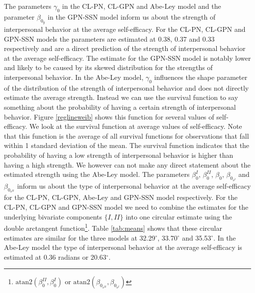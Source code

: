 \documentclass[man]{apa6}
\let\rmarkdownfootnote\footnote%
\def\footnote{\protect\rmarkdownfootnote}
\begin{document}
The parameters \(\gamma_0\) in the CL-PN, CL-GPN and Abe-Ley model and the
parameter \(\beta_{0_y}\) in the GPN-SSN model inform us about the strength of
interpersonal behavior at the average self-efficacy. For the CL-PN, CL-GPN and
GPN-SSN models the parameters are estimated at 0.38, 0.37 and 0.33 respectively
and are a direct prediction of the strength of interpersonal behavior at the
average self-efficacy. The estimate for the GPN-SSN model is notably lower and
likely to be caused by its skewed distribution for the strengths of
interpersonal behavior. In the Abe-Ley model, \(\gamma_0\) influences the shape
parameter of the distribution of the strength of interpersonal behavior and does
not directly estimate the average strength. Instead we can use the survival
function to say something about the probability of having a certain strength of
interpersonal behavior. Figure \ref{reglineweib} shows this function for several
values of self-efficacy. We look at the survival function at average values of
self-efficacy. Note that this function is the average of all survival functions
for observations that fall within 1 standard deviation of the mean. The survival
function indicates that the probability of having a low strength of
interpersonal behavior is higher than having a high strength. We however can not
make any direct statement about the estimated strength using the Abe-Ley
model.\newline
\indent The parameters \(\beta_0^{I}\), \(\beta_0^{II}\), \(\beta_0\),
\(\beta_{0_{s^{I}}}\) and \(\beta_{0_{s^{II}}}\) inform us about the type of
interpersonal behavior at the average self-efficacy for the CL-PN, CL-GPN,
Abe-Ley and GPN-SSN model respectively. For the CL-PN, CL-GPN and GPN-SSN model
we need to combine the estimates for the underlying bivariate components \(\{I, II\}\) into one circular estimate using the double arctangent
function\footnote{\(\mbox{atan2}(\beta_0^{II}, \beta_0^{I})\) or
\(\mbox{atan2}(\beta_{0_{s^{II}}}, \beta_{0_{s^{I}}})\)}.
Table \ref{tab:means} shows that these circular estimates are similar for the
three models at 32.29\(^\circ\), 33.70\(^\circ\) and 35.53\(^\circ\). In the Abe-Ley
model the type of interpersonal behavior at the average self-efficacy is
estimated at 0.36 radians or 20.63\(^\circ\).
\end{document}

